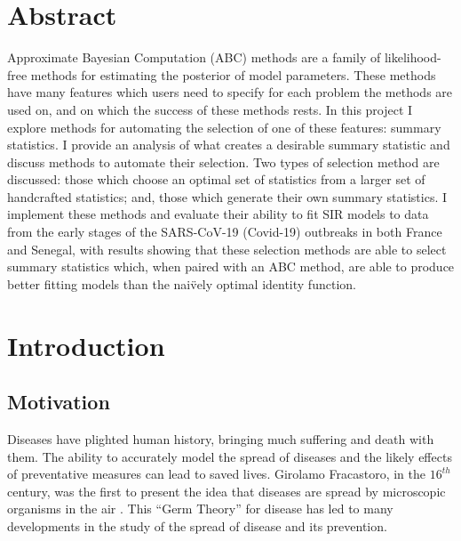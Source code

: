 \documentclass[11pt,a4paper]{article}
\theoremstyle{break}
\begin{document}
\newpage
\section*{Abstract}\label{sec_abstract}

  \noindent Approximate Bayesian Computation (ABC) methods are a family of likelihood-free methods for estimating the posterior of model parameters. These methods have many features which users need to specify for each problem the methods are used on, and on which the success of these methods rests. In this project I explore methods for automating the selection of one of these features: summary statistics. I provide an analysis of what creates a desirable summary statistic and discuss methods to automate their selection. Two types of selection method are discussed: those which choose an optimal set of statistics from a larger set of handcrafted statistics; and, those which generate their own summary statistics. I implement these methods and evaluate their ability to fit SIR models to data from the early stages of the SARS-CoV-19 (Covid-19) outbreaks in both France and Senegal, with results showing that these selection methods are able to select summary statistics which, when paired with an ABC method, are able to produce better fitting models than the nai\"vely optimal identity function.

\newpage
\tableofcontents

\newpage
{}
\setcounter{page}{1}
\section{Introduction}\label{sec_introduction}

\subsection{Motivation}\label{sec_motivation}

  \par Diseases have plighted human history, bringing much suffering and death with them. The ability to accurately model the spread of diseases and the likely effects of preventative measures can lead to saved lives. Girolamo Fracastoro, in the $16^{th}$ century, was the first to present the idea that diseases are spread by microscopic organisms in the air \cite[]{girolamo_fracastoro}. This ``Germ Theory'' for disease has led to many developments in the study of the spread of disease and its prevention.
\end{document}

